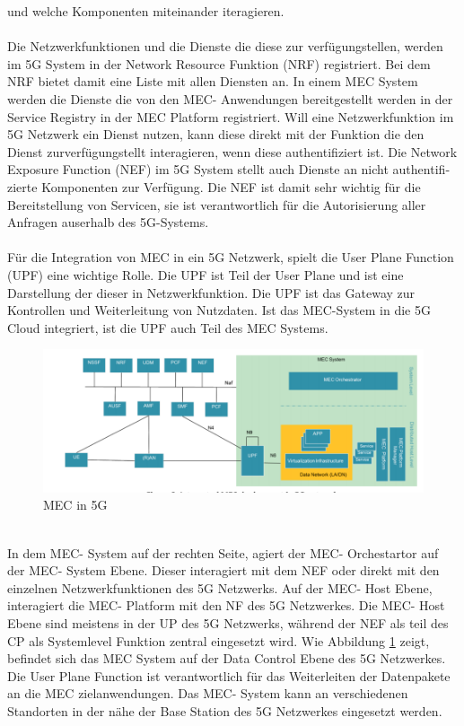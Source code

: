 \documentclass[runningheads]{llncs}
\numberwithin{figure}{section}
\begin{document}
und welche Komponenten miteinander iteragieren.
\\
\\
Die Netzwerkfunktionen und die Dienste die diese zur verfügungstellen, werden im 5G System in der Network Resource Funktion (NRF) registriert.
Bei dem NRF bietet damit eine Liste mit allen Diensten an. 
In einem MEC System werden die Dienste die von den MEC- Anwendungen bereitgestellt werden in der Service Registry in der MEC Platform registriert.
Will eine Netzwerkfunktion im 5G Netzwerk ein Dienst nutzen, kann diese direkt mit der Funktion die den Dienst zurverfügungstellt interagieren,
wenn diese au­then­ti­fi­zie­rt ist. Die Network Exposure Function (NEF) im 5G System stellt auch Dienste an nicht au­then­ti­fi­zie­rte Komponenten 
zur Verfügung. Die NEF ist damit sehr wichtig für die Bereitstellung von Servicen, sie ist verantwortlich für die Autorisierung aller Anfragen
auserhalb des 5G-Systems. 
\\
\\
Für die Integration von MEC in ein 5G Netzwerk, spielt die User Plane Function (UPF) eine wichtige Rolle. Die UPF ist Teil der User Plane
und ist eine Darstellung der dieser in Netzwerkfunktion. Die UPF ist das Gateway zur Kontrollen und Weiterleitung von Nutzdaten. \cite{Leitfaden5GCampusnetze2020}
Ist das MEC-System in die 5G Cloud integriert, ist die UPF auch Teil des MEC Systems.
\begin{figure}
  \includegraphics[width=\linewidth]{images/5GMEC-System-Architecture2.png}
  \caption{MEC in 5G}
  \label{fig:sba2}
\end{figure}
\\
In dem MEC- System auf der rechten Seite, agiert der MEC- Orchestartor auf der MEC- System Ebene. Dieser interagiert mit dem NEF oder
direkt mit den einzelnen Netzwerkfunktionen des 5G Netzwerks. Auf der MEC- Host Ebene, interagiert die MEC- Platform mit den NF des 5G Netzwerkes.
Die MEC- Host Ebene sind meistens in der UP des 5G Netzwerks, während der NEF als teil des CP als Systemlevel Funktion zentral eingesetzt wird.
Wie Abbildung \ref{fig:sba2} zeigt, befindet sich das MEC System auf der Data Control Ebene des 5G Netzwerkes. 
Die User Plane Function ist verantwortlich für das Weiterleiten der Datenpakete an die MEC zielanwendungen. 
Das MEC- System kann an verschiedenen Standorten in der nähe der Base Station des 5G Netzwerkes eingesetzt werden. 
\end{document}
